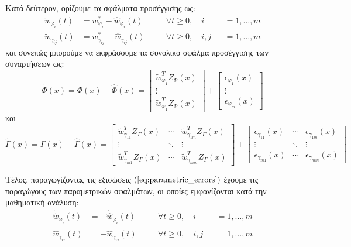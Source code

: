 Κατά δεύτερον, ορίζουμε τα σφάλματα προσέγγισης ως:
\begin{equation}
\begin{alignedat}{3}
	\tilde{w}_{\varphi_i}(t) &= w_{\varphi_i}^* - \hat{w}_{\varphi_i}(t) \quad &&\forall t \geq 0, \quad  i&&= 1,\dots,m \\
	\tilde{w}_{\gamma_{ij}}(t) &= w_{\gamma_{ij}}^* - \hat{w}_{\gamma_{ij}}(t)
	\quad &&\forall t \geq 0, \quad  i,j&&= 1,\dots,m 
	\end{alignedat}
	\label{eq:parametric_errors}
\end{equation}
και συνεπώς μπορούμε να εκφράσουμε τα συνολικό σφάλμα προσέγγισης των συναρτήσεων ως:
\begin{equation}
\tilde{\Phi}(x) = \Phi(x) - \hat{\Phi}(x) = 
	\begin{bmatrix}
	\tilde{w}_{\varphi_1}^T Z_{\Phi}(x) \\ \vdots \\ \tilde{w}_{\varphi_1}^T Z_{\Phi}(x)
	\end{bmatrix} + 
	\begin{bmatrix}
	\epsilon_{\varphi_1}(x) \\ \vdots \\ \epsilon_{\varphi_m}(x) 
	\end{bmatrix}
\end{equation}
και 
\begin{equation}
\tilde{\Gamma}(x) = \Gamma(x) - \hat{\Gamma}(x) = 
\begin{bmatrix} \tilde{w}_{\gamma_{11}}^T Z_{\Gamma}(x) & \cdots & \tilde{w}_{\gamma_{1m}}^T Z_{\Gamma}(x) \\
\vdots    & \ddots & \vdots         \\
\tilde{w}_{\gamma_{m1}}^T Z_{\Gamma}(x) & \cdots & \tilde{w}_{\gamma_{mm}}^T Z_{\Gamma}(x)
\end{bmatrix} +
\begin{bmatrix} \epsilon_{\gamma_{11}}(x) & \cdots & \epsilon_{\gamma_{1m}}(x) \\
\vdots    & \ddots & \vdots         \\
\epsilon_{\gamma_{m1}}(x) & \cdots & \epsilon_{\gamma_{mm}}(x)
\end{bmatrix}
\end{equation}

Τέλος, παραγωγίζοντας τις εξισώσεις $(\ref{eq:parametric_errors})$ έχουμε τις παραγώγους των παραμετρικών σφαλμάτων, οι οποίες εμφανίζονται κατά την μαθηματική ανάλυση:
\begin{equation}
\begin{alignedat}{3}
\dot{\tilde{w}}_{\varphi_i}(t) &=  - \dot{\hat{w}}_{\varphi_i}(t) \quad &&\forall t \geq 0, \quad  i&&= 1,\dots,m \\
\dot{\hat{w}}_{\gamma_{ij}}(t) &=  - \dot{\hat{w}}_{\gamma_{ij}}(t)
\quad &&\forall t \geq 0, \quad  i,j&&= 1,\dots,m 
\end{alignedat}
\label{eq:parametric_error_derivatives}
\end{equation}

